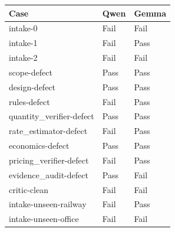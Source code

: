 \begin{tabularx}{\linewidth}{Xll}
\toprule
Case & Qwen & Gemma \\
\midrule
intake-0 & Fail & Fail \\
intake-1 & Fail & Pass \\
intake-2 & Fail & Fail \\
scope-defect & Pass & Pass \\
design-defect & Pass & Pass \\
rules-defect & Fail & Pass \\
quantity\_verifier-defect & Pass & Pass \\
rate\_estimator-defect & Fail & Pass \\
economics-defect & Pass & Pass \\
pricing\_verifier-defect & Fail & Pass \\
evidence\_audit-defect & Pass & Fail \\
critic-clean & Fail & Fail \\
intake-unseen-railway & Fail & Pass \\
intake-unseen-office & Fail & Fail \\
\bottomrule
\end{tabularx}
